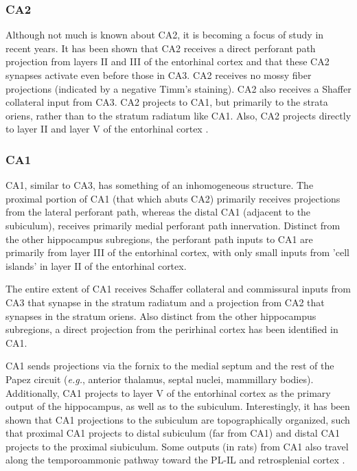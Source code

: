 \documentclass[doc, longtable]{apa6}
\begin{document}
\subsubsection{CA2}
Although not much is known about CA2, it is becoming a focus of study in recent years. It has been shown that CA2 receives a direct perforant path projection from layers II and III of the entorhinal cortex and that these CA2 synapses activate even before those in CA3. CA2 receives no mossy fiber projections (indicated by a negative Timm's staining). CA2 also receives a Shaffer collateral input from CA3. CA2 projects to CA1, but primarily to the strata oriens, rather than to the stratum radiatum like CA1. Also, CA2 projects directly to layer II and layer V of the entorhinal cortex \parencite{Rowland2013a}.

\subsubsection{CA1}
CA1, similar to CA3, has something of an inhomogeneous structure. The proximal portion of CA1 (that which abuts CA2) primarily receives projections from the lateral perforant path, whereas the distal CA1 (adjacent to the subiculum), receives primarily medial perforant path innervation. Distinct from the other hippocampus subregions, the perforant path inputs to CA1 are primarily from layer III of the entorhinal cortex, with only small inputs from 'cell islands' in layer II of the entorhinal cortex. 

The entire extent of CA1 receives Schaffer collateral and commissural inputs from CA3 that synapse in the stratum radiatum and a projection from CA2 that synapses in the stratum oriens. Also distinct from the other hippocampus subregions, a direct projection from the perirhinal cortex has been identified in CA1.

CA1 sends projections via the fornix to the medial septum and the rest of the Papez circuit (\textit{e.g.}, anterior thalamus, septal nuclei, mammillary bodies). Additionally, CA1 projects to layer V of the entorhinal cortex as the primary output of the hippocampus, as well as to the subiculum. Interestingly, it has been shown that CA1 projections to the subiculum are topographically organized, such that proximal CA1 projects to distal subiculum (far from CA1) and distal CA1 projects to the proximal siubiculum. Some outputs (in rats) from CA1 also travel along the temporoammonic pathway toward the PL-IL and retrosplenial cortex \parencite{Jay1991a}.
\end{document}
